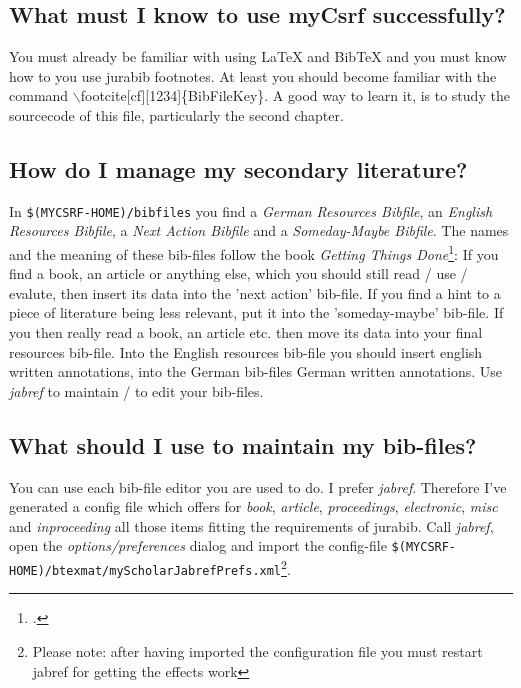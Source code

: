 \documentclass[DIV=calc,BCOR=5mm,11pt,headings=small,oneside,abstract=true, toc=bib]{scrartcl}
\begin{document}
\subsection{What must I know to use myCsrf successfully?}
You must already be familiar with using LaTeX and BibTeX and you must know how
to you use jurabib footnotes. At least you should become familiar with the
command $\backslash$footcite[cf][1234]\{BibFileKey\}. A good way to learn it, is to
study the sourcecode of this file, particularly the second chapter.

\subsection{How do I manage my secondary literature?}
In \texttt{\$(MYCSRF-HOME)/bibfiles} you find a \textit{German Resources
Bibfile}, an \textit{English Resources Bibfile}, a \textit{Next Action Bibfile}
and a \textit{Someday-Maybe Bibfile}. The names and the meaning of these
bib-files follow the book \textit{Getting Things Done}\footcite[cf.][36 et
passim]{Allen2001a}: If you find a book, an article or anything else, which you
should still read / use / evalute, then insert its data into the 'next action'
bib-file. If you find a hint to a piece of literature being less relevant, put
it into the 'someday-maybe' bib-file. If you then really read a book, an article
etc. then move its data into your final resources bib-file. Into the English
resources bib-file you should insert english written annotations, into the
German bib-files German written annotations. Use \textit{jabref} to maintain /
to edit your bib-files.

\subsection{What should I use to maintain my bib-files?}
You can use each bib-file editor you are used to do. I prefer \textit{jabref}.
There\-fo\-re I've generated a config file which offers for \textit{book},
\textit{article}, \textit{proceedings}, \textit{elec\-tro\-nic}, \textit{misc}
and \textit{inproceeding} all those items fitting the requirements of jurabib. Call
\textit{jabref}, open the \textit{options/preferences} dialog and import the
config-file
\texttt{\$(MYCSRF-HOME)/btexmat/myScholarJabrefPrefs.xml}\footnote{Please
note: after having imported the configuration file you must restart jabref for
getting the effects work}.
\end{document}
